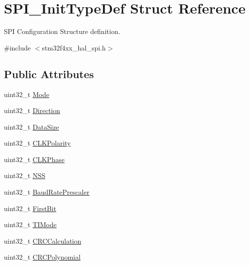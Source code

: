 \hypertarget{struct_s_p_i___init_type_def}{}\section{S\+P\+I\+\_\+\+Init\+Type\+Def Struct Reference}
\label{struct_s_p_i___init_type_def}


S\+PI Configuration Structure definition.  




{\ttfamily \#include $<$stm32f4xx\+\_\+hal\+\_\+spi.\+h$>$}

\subsection*{Public Attributes}
\begin{DoxyCompactItemize}
\item 
uint32\+\_\+t \hyperlink{struct_s_p_i___init_type_def_a5247eb0463437c9980a9d4a5300b50a5}{Mode}
\item 
uint32\+\_\+t \hyperlink{struct_s_p_i___init_type_def_ae5c132f597c806d7a1fe316023b36867}{Direction}
\item 
uint32\+\_\+t \hyperlink{struct_s_p_i___init_type_def_a24b7835dd877e1c4e55236303fa3387f}{Data\+Size}
\item 
uint32\+\_\+t \hyperlink{struct_s_p_i___init_type_def_a96922c7ff9e589ebd9611fc4ab730454}{C\+L\+K\+Polarity}
\item 
uint32\+\_\+t \hyperlink{struct_s_p_i___init_type_def_ab21a458209f2588f49a2353c56f62625}{C\+L\+K\+Phase}
\item 
uint32\+\_\+t \hyperlink{struct_s_p_i___init_type_def_aed541d17808213ac6f90ac7deb2bec5f}{N\+SS}
\item 
uint32\+\_\+t \hyperlink{struct_s_p_i___init_type_def_a1d553f90738cb633a9298d2b4d306fde}{Baud\+Rate\+Prescaler}
\item 
uint32\+\_\+t \hyperlink{struct_s_p_i___init_type_def_a8c541d8863cb62a3212b9381b5cba447}{First\+Bit}
\item 
uint32\+\_\+t \hyperlink{struct_s_p_i___init_type_def_a60db7e87bb66775df6213e4006dfd876}{T\+I\+Mode}
\item 
uint32\+\_\+t \hyperlink{struct_s_p_i___init_type_def_a3472de9bd9247c1d97312aff7e58e385}{C\+R\+C\+Calculation}
\item 
uint32\+\_\+t \hyperlink{struct_s_p_i___init_type_def_abdaf3ccbfa4ef68cc81fd32f29baa678}{C\+R\+C\+Polynomial}
\end{DoxyCompactItemize}


